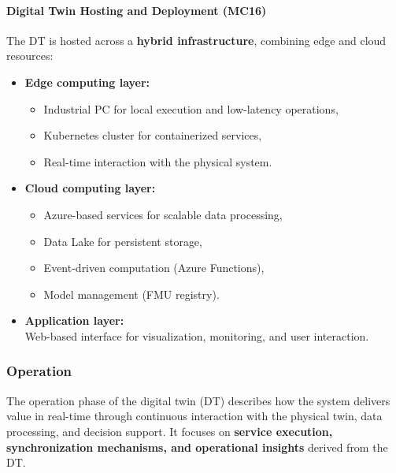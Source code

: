\documentclass[
]{article}
\providecommand{\tightlist}{%
  \setlength{\itemsep}{0pt}\setlength{\parskip}{0pt}}
\begin{document}
\paragraph{Digital Twin Hosting and Deployment
(MC16)}\label{digital-twin-hosting-and-deployment-mc16}

The DT is hosted across a \textbf{hybrid infrastructure}, combining edge
and cloud resources:

\begin{itemize}
\tightlist
\item
  \textbf{Edge computing layer:}

  \begin{itemize}
  \tightlist
  \item
    Industrial PC for local execution and low-latency operations,
  \item
    Kubernetes cluster for containerized services,
  \item
    Real-time interaction with the physical system.
  \end{itemize}
\item
  \textbf{Cloud computing layer:}

  \begin{itemize}
  \tightlist
  \item
    Azure-based services for scalable data processing,
  \item
    Data Lake for persistent storage,
  \item
    Event-driven computation (Azure Functions),
  \item
    Model management (FMU registry).
  \end{itemize}
\item
  \textbf{Application layer:}\\
  Web-based interface for visualization, monitoring, and user
  interaction.\\
\end{itemize}

\subsubsection{Operation}\label{operation}

The operation phase of the digital twin (DT) describes how the system
delivers value in real-time through continuous interaction with the
physical twin, data processing, and decision support. It focuses on
\textbf{service execution, synchronization mechanisms, and operational
insights} derived from the DT.
\end{document}
